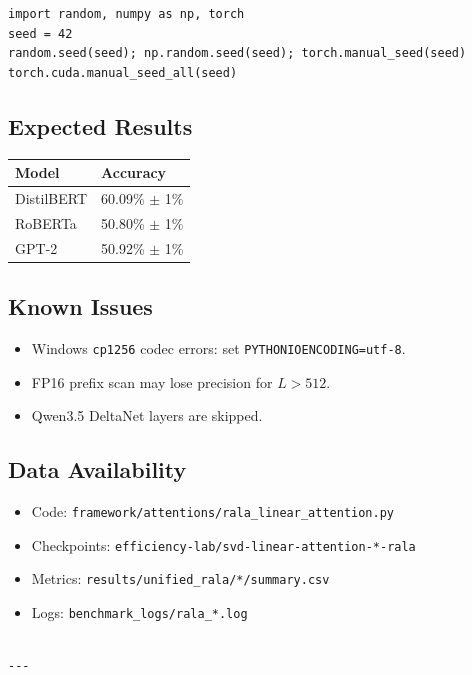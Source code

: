 \begin{lstlisting}
import random, numpy as np, torch
seed = 42
random.seed(seed); np.random.seed(seed); torch.manual_seed(seed)
torch.cuda.manual_seed_all(seed)
\end{lstlisting}

\subsection{Expected Results}

\begin{table}[H]
\centering
\small
\begin{tabular}{ll}
\toprule
\textbf{Model} & \textbf{Accuracy} \\
\midrule
DistilBERT & 60.09\% $\pm$ 1\% \\
RoBERTa & 50.80\% $\pm$ 1\% \\
GPT-2 & 50.92\% $\pm$ 1\% \\
\bottomrule
\end{tabular}
\end{table}

\subsection{Known Issues}

\begin{itemize}
\item Windows \texttt{cp1256} codec errors: set \texttt{PYTHONIOENCODING=utf-8}.
\item FP16 prefix scan may lose precision for $L > 512$.
\item Qwen3.5 DeltaNet layers are skipped.

\end{itemize}
\subsection{Data Availability}

\begin{itemize}
\item Code: \texttt{framework/attentions/rala\_linear\_attention.py}
\item Checkpoints: \texttt{efficiency-lab/svd-linear-attention-*-rala}
\item Metrics: \texttt{results/unified\_rala/*/summary.csv}
\item Logs: \texttt{benchmark\_logs/rala\_*.log}
\end{itemize}
\begin{lstlisting}

---
\end{lstlisting}


